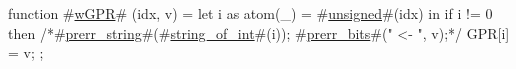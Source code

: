 function #\hyperref[zwGPR]{wGPR}# (idx, v) = {
  let i as atom(_) = #\hyperref[zunsigned]{unsigned}#(idx) in
  if i != 0 then {
    /*#\hyperref[zprerrzystring]{prerr\_string}#(#\hyperref[zstringzyofzyint]{string\_of\_int}#(i));
    #\hyperref[zprerrzybits]{prerr\_bits}#(" <- ", v);*/
    GPR[i] = v;
  };
}
